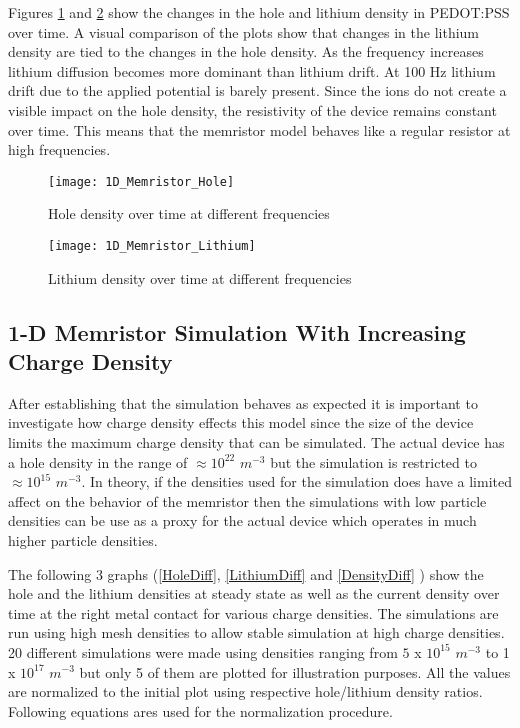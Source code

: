 \begin{doublespace}
Figures \ref{Bowhole} and \ref{Bowli} show the changes in the hole and lithium density in PEDOT:PSS over time. A visual comparison of the plots show that changes in the lithium density are tied to the changes in the hole density. As the frequency increases lithium diffusion becomes more dominant than lithium drift. At 100 Hz lithium drift due to the applied potential is barely present. Since the ions do not create a visible impact on the hole density, the resistivity of the device remains constant over time. This means that the memristor model behaves like a regular resistor at high frequencies.


\begin{figure}[!htp]
\centering
\texttt{[image: 1D\_Memristor\_Hole]}
\caption{Hole density over time at different frequencies} 
\label{Bowhole}
\end{figure}

\begin{figure}[!htp]
\centering
\texttt{[image: 1D\_Memristor\_Lithium]}
\caption{Lithium density over time at different frequencies} 
\label{Bowli}
\end{figure}


\clearpage
\subsection{1-D Memristor Simulation With Increasing Charge Density}

After establishing that the simulation behaves as expected it is important to investigate how charge density effects this model since the size of the device limits the maximum charge density that can be simulated. The actual device has a hole density in the range of $ \approx 10^{22}$ $m^{-3}$ but the simulation is restricted to $\approx 10^{15}$ $m^{-3}$. In theory, if the densities used for the simulation does have a limited affect on the behavior of the memristor then the simulations with low particle densities can be use as a proxy for the actual device which operates in much higher particle densities.

 The following 3 graphs (\ref{HoleDiff}, \ref{LithiumDiff} and \ref{DensityDiff} ) show the hole and the lithium densities at steady state as well as the current density over time at the right metal contact for various charge densities. The simulations are run using high mesh densities to allow stable simulation at high charge densities. 20 different simulations were made using densities ranging from $5$ x $10^{15}$  $m^{-3}$ to 1 x $10^{17}$  $m^{-3}$ but only 5 of them are plotted for illustration purposes. All the values are normalized to the initial plot using respective hole/lithium density ratios. Following equations ares used for the normalization procedure.



\end{doublespace}
